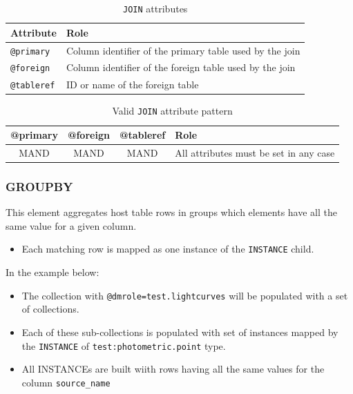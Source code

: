 \documentclass[11pt,a4paper]{ivoa}
\begin{document}
\begin{table}[!htbp]
\small
\centering
\begin{tabulary}{\linewidth}{|L|J|}
       \hline
           \textbf{Attribute} &  
           \textbf{Role} \\
       \hline  \hline
           \texttt{@primary}    & 
           Column identifier of the primary table used  by the join \\       
       \hline  
           \texttt{@foreign}    & 
           Column identifier of the foreign table used  by the join \\       
      \hline  
           \texttt{@tableref}    & 
           ID or name of the foreign table \\       
       \hline 
\end{tabulary}
\caption{\texttt{JOIN} attributes} 
\label{tbl:join-att}
\end{table}

\begin{table}[!htbp]
\small
\centering
\begin{tabulary}{\linewidth}{|C|C|C|J|}
       \hline \hline
           \textbf{@primary} &  
           \textbf{@foreign} &                     
           \textbf{@tableref} &          
           \textbf{Role} \\
       \hline  
           MAND    &            
           MAND    &            
           MAND    & 
           All attributes must be set in any case \\       
       \hline 
\end{tabulary}
\caption{Valid \texttt{JOIN} attribute pattern} 
\label{tbl:join-patterns}
\end{table}
\FloatBarrier

%
%

\subsubsection{GROUPBY}
This element aggregates host table rows  in groups which elements have all the same value for a given column.

\begin{itemize}
    \item Each matching row  is mapped as one instance of the \texttt{INSTANCE} child.
\end{itemize}

In the example below:

\begin{itemize}
    \item The collection with \texttt{@dmrole=test.lightcurves} will be populated with a set of collections.
    \item Each of these sub-collections is populated with set of instances mapped by the \texttt{INSTANCE} of \texttt{test:photometric.point} type.
    \item All INSTANCEs are built wiith rows having all the same values for the column \texttt{source\_name}
\end{itemize}
\end{document}
